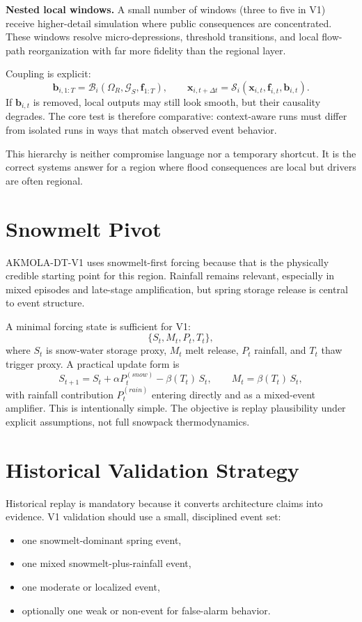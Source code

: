 \documentclass[11pt,a4paper]{article}
\begin{document}
\textbf{Nested local windows.} A small number of windows (three to five in V1) receive higher-detail simulation where public consequences are concentrated. These windows resolve micro-depressions, threshold transitions, and local flow-path reorganization with far more fidelity than the regional layer.

Coupling is explicit:
\[
\mathbf{b}_{i,1:T}=\mathcal{B}_i(\Omega_R,\mathcal{G}_S,\mathbf{f}_{1:T}),\qquad
\mathbf{x}_{i,t+\Delta t}=\mathcal{S}_i(\mathbf{x}_{i,t},\mathbf{f}_{i,t},\mathbf{b}_{i,t}).
\]
If $\mathbf{b}_{i,t}$ is removed, local outputs may still look smooth, but their causality degrades. The core test is therefore comparative: context-aware runs must differ from isolated runs in ways that match observed event behavior.

This hierarchy is neither compromise language nor a temporary shortcut. It is the correct systems answer for a region where flood consequences are local but drivers are often regional.

\section{Snowmelt Pivot}

AKMOLA-DT-V1 uses snowmelt-first forcing because that is the physically credible starting point for this region. Rainfall remains relevant, especially in mixed episodes and late-stage amplification, but spring storage release is central to event structure.

A minimal forcing state is sufficient for V1:
\[
\{S_t,M_t,P_t,T_t\},
\]
where $S_t$ is snow-water storage proxy, $M_t$ melt release, $P_t$ rainfall, and $T_t$ thaw trigger proxy. A practical update form is
\[
S_{t+1}=S_t + \alpha P_t^{(snow)}-\beta(T_t)\,S_t,\qquad
M_t=\beta(T_t)\,S_t,
\]
with rainfall contribution $P_t^{(rain)}$ entering directly and as a mixed-event amplifier. This is intentionally simple. The objective is replay plausibility under explicit assumptions, not full snowpack thermodynamics.

\section{Historical Validation Strategy}

Historical replay is mandatory because it converts architecture claims into evidence. V1 validation should use a small, disciplined event set:
\begin{itemize}
  \item one snowmelt-dominant spring event,
  \item one mixed snowmelt-plus-rainfall event,
  \item one moderate or localized event,
  \item optionally one weak or non-event for false-alarm behavior.
\end{itemize}
\end{document}
